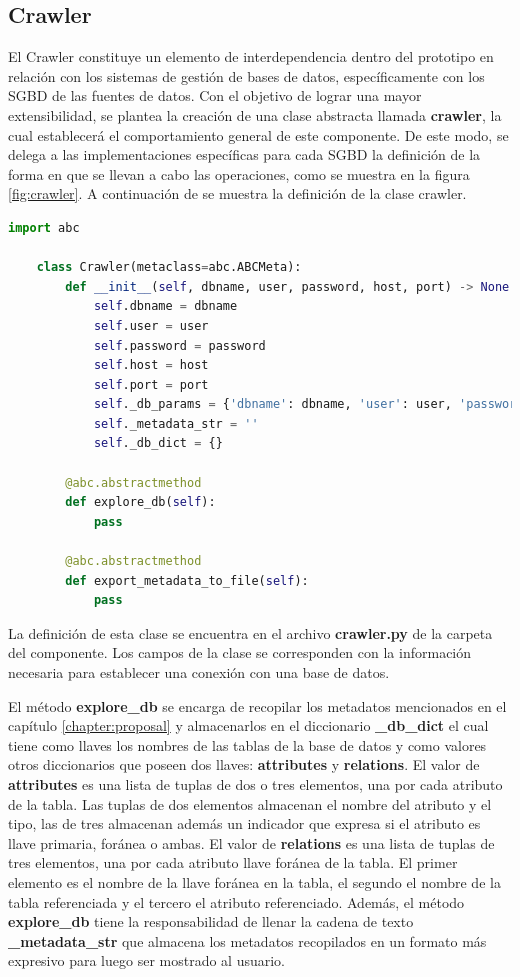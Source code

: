 \subsection{Crawler}

El Crawler constituye un elemento de interdependencia dentro del prototipo en relación con los sistemas 
de gestión de bases de datos, específicamente con los SGBD de las fuentes de datos. Con el objetivo de lograr una 
mayor extensibilidad, se plantea la creación de una clase abstracta llamada \textbf{crawler}, la cual establecerá 
el comportamiento general de este componente. De este modo, se delega a las implementaciones específicas para cada 
SGBD la definición de la forma en que se llevan a cabo las operaciones, como se muestra en la figura \ref{fig:crawler}.
A continuación de se muestra la definición de la clase crawler.

\begin{lstlisting}[label={code:crawler}, caption={clase abstracta crawler}, language={python}]
    import abc

    class Crawler(metaclass=abc.ABCMeta):
        def __init__(self, dbname, user, password, host, port) -> None:
            self.dbname = dbname
            self.user = user
            self.password = password
            self.host = host
            self.port = port
            self._db_params = {'dbname': dbname, 'user': user, 'password': password, 'host': host, 'port': port}
            self._metadata_str = ''
            self._db_dict = {}

        @abc.abstractmethod
        def explore_db(self):
            pass
        
        @abc.abstractmethod
        def export_metadata_to_file(self):
            pass

\end{lstlisting}

La definición de esta clase se encuentra en el archivo \textbf{crawler.py} de la carpeta del componente. Los 
campos de la clase se corresponden con la información necesaria para establecer una conexión con una base de 
datos. 

El método \textbf{explore\_db} se encarga de recopilar los metadatos mencionados en el capítulo \ref{chapter:proposal}
y almacenarlos en el diccionario \textbf{\_db\_dict} el cual tiene como llaves los nombres de las tablas de la base 
de datos y como valores otros diccionarios que poseen dos llaves: \textbf{attributes} y \textbf{relations}. 
El valor de \textbf{attributes} es una lista de tuplas de dos o tres elementos, una por cada atributo de la tabla. 
Las tuplas de dos elementos almacenan el nombre del atributo y el tipo, las de tres almacenan además un indicador 
que expresa si el atributo es llave primaria, for\'anea o ambas. El valor de \textbf{relations} es una lista de 
tuplas de tres elementos, una por cada atributo llave for\'anea de la tabla. El primer elemento es el nombre 
de la llave for\'anea en la tabla, el segundo el nombre de la tabla referenciada y el tercero el atributo referenciado. 
Además, el método \textbf{explore\_db} tiene la responsabilidad de llenar la cadena de texto \textbf{\_metadata\_str} 
que almacena los metadatos recopilados en un formato m\'as expresivo para luego ser mostrado al usuario.

